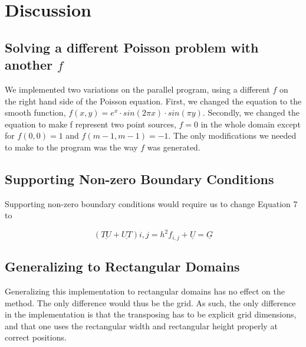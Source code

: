 \section{Discussion}

\subsection{Solving a different Poisson problem with another $f$}

We implemented two variations on the parallel program, using a different $f$ on
the right hand side of the Poisson equation. First, we changed the equation to
the smooth function, $f(x, y) = e^x \cdot sin ( 2 \pi x) \cdot sin (\pi y)$.
Secondly, we changed the equation to make f represent two point sources, $f = 0$
in the whole domain except for $f(0, 0) = 1$ and $f(m-1, m-1) = -1$. The only
modifications we needed to make to the program was the way $f$ was generated.

\subsection{Supporting Non-zero Boundary Conditions}

Supporting non-zero boundary conditions would require us to change Equation 7 to

\begin{equation}
  (\underline{TU} + \underline{UT})i,j = h^2f_{i,j} + \underline U = \underline{G}
\end{equation}



\subsection{Generalizing to Rectangular Domains}
Generalizing this implementation to rectangular domains has no effect on the
method. The only difference would thus be the grid. As such, the only difference
in the implementation is that the transposing has to be explicit grid
dimensions, and that one uses the rectangular width and rectangular height
properly at correct positions.
